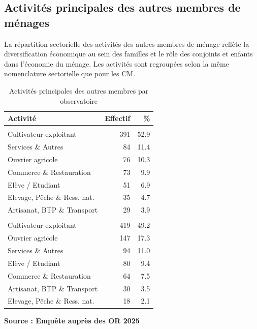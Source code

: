 \documentclass[
  french,
  letterpaper,
]{report}
\begin{document}
\subsection{Activités principales des autres membres de
ménages}\label{activituxe9s-principales-des-autres-membres-de-muxe9nages}

La répartition sectorielle des activités des autres membres de ménage
reflète la diversification économique au sein des familles et le rôle
des conjoints et enfants dans l'économie du ménage. Les activités sont
regroupées selon la même nomenclature sectorielle que pour les CM.

\begin{table}
\caption*{
{\fontsize{20}{25}\selectfont  Activités principales des autres membres par observatoire\fontsize{12}{15}\selectfont }
} 
\fontsize{12.0pt}{14.0pt}\selectfont
\begin{tabular*}{\linewidth}{@{\extracolsep{\fill}}lrr}
\toprule
Activité & Effectif & \% \\ 
\midrule\addlinespace[2.5pt]
\multicolumn{3}{l}{{\bfseries {Alaotra}}} \\[2.5pt] 
\midrule\addlinespace[2.5pt]
Cultivateur exploitant & 391 & 52.9 \\ 
Services \& Autres & 84 & 11.4 \\ 
Ouvrier agricole & 76 & 10.3 \\ 
Commerce \& Restauration & 73 & 9.9 \\ 
Elève / Etudiant & 51 & 6.9 \\ 
Elevage, Pêche \& Ress. nat. & 35 & 4.7 \\ 
Artisanat, BTP \& Transport & 29 & 3.9 \\ 
\midrule\addlinespace[2.5pt]
\multicolumn{3}{l}{{\bfseries {Marovoay}}} \\[2.5pt] 
\midrule\addlinespace[2.5pt]
Cultivateur exploitant & 419 & 49.2 \\ 
Ouvrier agricole & 147 & 17.3 \\ 
Services \& Autres & 94 & 11.0 \\ 
Elève / Etudiant & 80 & 9.4 \\ 
Commerce \& Restauration & 64 & 7.5 \\ 
Artisanat, BTP \& Transport & 30 & 3.5 \\ 
Elevage, Pêche \& Ress. nat. & 18 & 2.1 \\ 
\bottomrule
\end{tabular*}
\begin{minipage}{\linewidth}
\textbf{Source : Enquête auprès des OR 2025}\\
\end{minipage}
\end{table}
\end{document}
